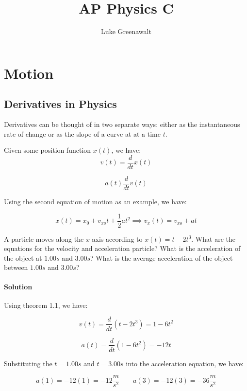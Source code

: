 \documentclass{scrartcl}
\theoremstyle{definition}
\begin{document}
	\title{AP Physics C}
	\author{Luke Greenawalt}
	\maketitle
	
	\section{Motion}
	
	\subsection{Derivatives in Physics}
	
	Derivatives can be thought of in two separate ways: either as the instantaneous rate of change or as the slope of a curve at at a time $t$.
	
	\begin{theorem} Given some position function $x(t)$, we have:
		$$
		v(t) = \frac{d}{dt} x(t)
		$$
		
		$$
		a(t) \frac{d}{dt} v(t)
		$$
		
		\noindent Using the second equation of motion as an example, we have:
		
		$$
		x(t) = x_0 + v_{xo} t + \frac{1}{2} at^2 \implies
		v_x (t) = v_{xo} + at
		$$
	\end{theorem}
	
	\begin{example}
		A particle moves along the $x$-axis according to $x(t) = t - 2t^3$. What are the equations for the velocity and acceleration particle? What is the acceleration of the object at $1.00s$ and $3.00s$? What is the average acceleration of the object between $1.00s$ and $3.00s$?
	\end{example}
	
	\paragraph{Solution} Using theorem 1.1, we have:
	
	$$
	v(t) = \frac{d}{dt} (t-2t^3) = 1 - 6t^2
	$$
	
	$$
	a(t) = \frac{d}{dt} (1-6t^2) = -12t
	$$
	
	\noindent Substituting the $t=1.00s$ and $t=3.00s$ into the acceleration equation, we have:
	
	$$
	a(1) = -12(1) = -12 \frac{m}{s^2} \quad \quad a(3) = -12(3) = -36 \frac{m}{s^2}
	$$
	
\end{document}
